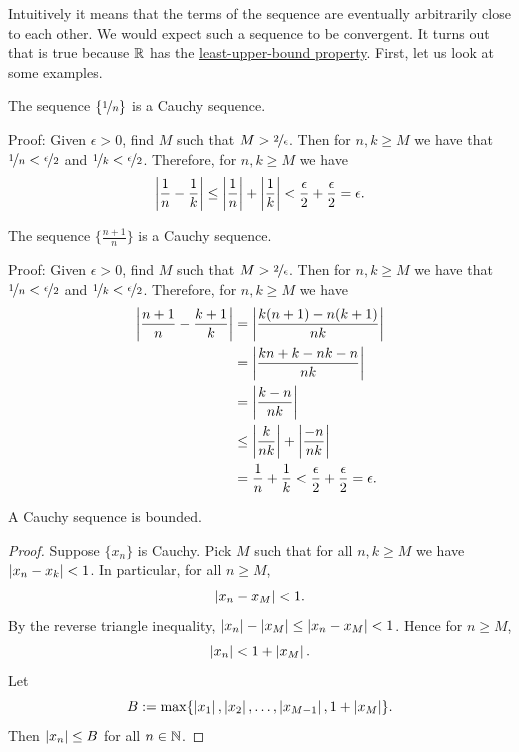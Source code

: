 Intuitively it means that the terms of the sequence are eventually
arbitrarily close to each other.  We would expect such a sequence to be
convergent.  It turns out that is true because ${\mathbb{R}}$ has the
\hyperref[defn:lub]{least-upper-bound property}.  First, let us look at some examples.

\begin{example}
The sequence $\{ \nicefrac{1}{n} \}$ is a Cauchy sequence.

Proof:  Given $\epsilon > 0$, find $M$ such that
$M > \nicefrac{2}{\epsilon}$.  Then for $n,k \geq M$
we have that $\nicefrac{1}{n} < \nicefrac{\epsilon}{2}$
and
$\nicefrac{1}{k} < \nicefrac{\epsilon}{2}$.  Therefore, for $n, k \geq M$
we have
\begin{equation*}
\left\lvert {\frac{1}{n} - \frac{1}{k}} \right\rvert
\leq
\left\lvert {\frac{1}{n}} \right\rvert + \left\lvert {\frac{1}{k}} \right\rvert
< \frac{\epsilon}{2} + \frac{\epsilon}{2} = \epsilon.
\end{equation*}
\end{example}

\begin{example}
The sequence $\{ \frac{n+1}{n} \}$ is a Cauchy sequence.

Proof:  Given $\epsilon > 0$, find $M$ such that
$M > \nicefrac{2}{\epsilon}$.  Then for $n,k \geq M$
we have that $\nicefrac{1}{n} < \nicefrac{\epsilon}{2}$
and
$\nicefrac{1}{k} < \nicefrac{\epsilon}{2}$.  Therefore, for $n, k \geq M$
we have
\begin{equation*}
\begin{split}
\left\lvert {\frac{n+1}{n} - \frac{k+1}{k}} \right\rvert
& =
\left\lvert {\frac{k(n+1)-n(k+1)}{nk}} \right\rvert
\\
& =
\left\lvert {\frac{kn+k-nk-n}{nk}} \right\rvert
\\
& =
\left\lvert {\frac{k-n}{nk}} \right\rvert
\\
& \leq
\left\lvert {\frac{k}{nk}} \right\rvert
+
\left\lvert {\frac{-n}{nk}} \right\rvert
\\
& = \frac{1}{n} + \frac{1}{k}
< \frac{\epsilon}{2} + \frac{\epsilon}{2} = \epsilon .
\end{split}
\end{equation*}
\end{example}

\begin{prop}
A Cauchy sequence is bounded.
\end{prop}

\begin{proof}
Suppose $\{ x_n \}$ is Cauchy.  Pick $M$ such that for all
$n,k \geq M$ we have $\left\lvert {x_n-x_k} \right\rvert < 1$.  In particular, 
for all $n \geq M$,
\begin{equation*}
\left\lvert {x_n - x_M} \right\rvert < 1 .
\end{equation*}
By the reverse triangle inequality,
$\left\lvert {x_n} \right\rvert - \left\lvert {x_M} \right\rvert \leq \left\lvert {x_n - x_M} \right\rvert < 1$.  Hence for $n \geq M$,
\begin{equation*}
\left\lvert {x_n} \right\rvert < 1 + \left\lvert {x_M} \right\rvert.
\end{equation*}
Let
\begin{equation*}
B := \max \{ \left\lvert {x_1} \right\rvert, \left\lvert {x_2} \right\rvert, \ldots, \left\lvert {x_{M-1}} \right\rvert, 1+ \left\lvert {x_M} \right\rvert \} .
\end{equation*}
Then $\left\lvert {x_n} \right\rvert \leq B$ for all $n \in {\mathbb{N}}$.
\end{proof}

